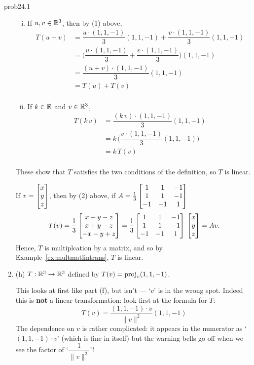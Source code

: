 \begin{sol}{prob24.1}
\begin{enumerate}[]
\smallskip
\begin{enumerate}[(i)]
\item If $u, v \in \mathbb{R}^3$, then by (1) above, 
\begin{equation*}
\begin{split}
 T(u+v) &=\dfrac{u\cdot (1,1,-1)}{3}(1,1,-1)+ \dfrac{v\cdot (1,1,-1)}{3}(1,1,-1) \\
  &= \Big( \dfrac{u\cdot (1,1,-1)}{3}+ \dfrac{v\cdot (1,1,-1)}{3}\Big)(1,1,-1)\\
  &= \dfrac{(u+v)\cdot (1,1,-1)}{3}(1,1,-1)\\
  &= T(u)+T(v)\\
\end{split}\end{equation*}
\item If $k\in \mathbb{R}$ and $v\in \mathbb{R}^3$,
 \begin{equation*}
\begin{split}
 T(k\,v) &=\dfrac{(k\,v)\cdot (1,1,-1)}{3}(1,1,-1) \\
  &= k\,\Big( \dfrac{ v\cdot (1,1,-1)}{3}(1,1,-1)\Big)\\
  &= k\,T(v)\\
\end{split}\end{equation*}
\end{enumerate}
These show that $T$ satisfies the two conditions of the definition, so $T$ is linear.

\medskip
{}
\smallskip
If $v=\bmatrix x\\y\\z\endbmatrix$, then by (2) above, if $A= \frac13\bmatrix
 1& 1& -1\\
 1& 1& -1\\ 
-1& -1& 1\endbmatrix$
$$T(v)= \frac13\bmatrix x+y-z\\x+y-z\\-x-y+z\endbmatrix= \frac13\bmatrix
 1& 1& -1\\
 1& 1& -1\\ 
-1& -1& 1\endbmatrix \, \bmatrix x\\y\\z\endbmatrix= A v.$$
Hence, $T$ is multiplcation by a matrix, and so by Example~\ref{ex:multmatlintrans}, $T$ is linear.
\medskip


\item (h) $T:\mathbb{R}^3 \to \mathbb{R}^3$ defined by $T(v)= \operatorname{proj}_{v}(1,1,-1)$.

\soln This looks at first like part (f), but isn't --- `$v$' is in the wrong spot. Indeed this is {\bf not} a linear transformation: look first at the formula for $T$:    $$T(v) =\dfrac{(1,1,-1)\cdot v }{\|v\|^2} (1,1,-1)$$ The dependence on $v$ is rather complicated: it appears in the numerator as `$(1,1,-1)\cdot v$' (which is fine in itself) but the warning bells go off when we see the factor of `$\dfrac{1}{\|v\|^2}$'! 


\end{enumerate}
\end{sol}
